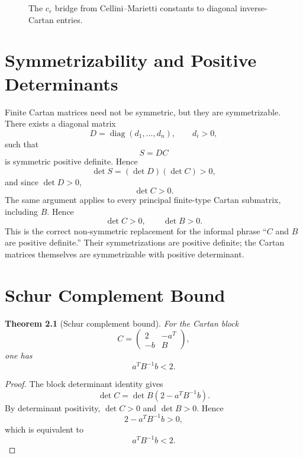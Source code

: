 \documentclass[11pt]{book}
\newtheorem{theorem}{Theorem}[chapter]
\theoremstyle{definition}
\begin{document}
\begin{figure}[h]
\centering
{}
\caption{The $c_\varepsilon$ bridge from Cellini--Marietti constants to diagonal inverse-Cartan entries.}
\end{figure}

\chapter{Symmetrizability and Positive Determinants}
Finite Cartan matrices need not be symmetric, but they are symmetrizable. There exists a diagonal matrix
\[
 D=\operatorname{diag}(d_1,\dots,d_n),\qquad d_i>0,
\]
such that
\[
 S=DC
\]
is symmetric positive definite. Hence
\[
 \det S=(\det D)(\det C)>0,
\]
and since $\det D>0$,
\[
 \det C>0.
\]
The same argument applies to every principal finite-type Cartan submatrix, including $B$. Hence
\[
 \det C>0,\qquad \det B>0.
\]
This is the correct non-symmetric replacement for the informal phrase ``$C$ and $B$ are positive definite.'' Their symmetrizations are positive definite; the Cartan matrices themselves are symmetrizable with positive determinant.

\chapter{Schur Complement Bound}
\begin{theorem}[Schur complement bound]\label{thm:schur}
For the Cartan block
\[
 C=\begin{pmatrix}2&-a^T\\-b&B\end{pmatrix},
\]
one has
\[
 \boxed{a^T B^{-1}b<2.}
\]
\end{theorem}
\begin{proof}
The block determinant identity gives
\[
 \det C=\det B(2-a^T B^{-1}b).
\]
By determinant positivity, $\det C>0$ and $\det B>0$. Hence
\[
 2-a^T B^{-1}b>0,
\]
which is equivalent to
\[
 a^T B^{-1}b<2.
\]
\end{proof}
\end{document}
